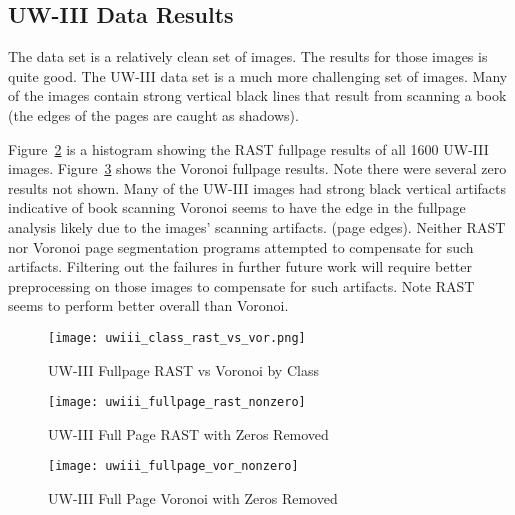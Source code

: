 \documentclass[conference]{IEEEtran}
\begin{document}
\subsection{UW-III Data Results}

The \cite{IEEEhowto:Winder} data set is a relatively clean set of images. The results for
those images is quite good. The UW-III data set is a much more challenging set
of images. Many of the images contain strong vertical black lines that result
from scanning a book (the edges of the pages are caught as shadows). 

Figure~\ref{fig:uwiii-fullpage-rast-nonzero} is a histogram showing the RAST fullpage results of
all 1600 UW-III images.  Figure~\ref{fig:uwiii-fullpage-vor-nonzero} shows the Voronoi
fullpage results. Note there were several zero results not shown. Many of the
UW-III images had strong black vertical artifacts indicative of book scanning
Voronoi seems to have the edge in the fullpage analysis likely due to the
images' scanning artifacts.  (page edges). Neither RAST nor Voronoi page
segmentation programs attempted to compensate for such artifacts. Filtering out
the failures in further future work will require better preprocessing on those
images to compensate for such artifacts. Note RAST seems to perform better
overall than Voronoi.

\begin{figure}[uwiii-class-rast-vs-vor]
\texttt{[image: uwiii\_class\_rast\_vs\_vor.png]}
\caption{UW-III Fullpage RAST vs Voronoi by Class}
\label{fig:uwiii-class-rast-vs-vor}
\end{figure}




\begin{figure}[uwiii-fullpage-rast-nonzero]
\texttt{[image: uwiii\_fullpage\_rast\_nonzero]}
\caption{UW-III Full Page RAST with Zeros Removed}
\label{fig:uwiii-fullpage-rast-nonzero}
\end{figure}
%
\begin{figure}[uwiii-fullpage-vor-nonzero]
\texttt{[image: uwiii\_fullpage\_vor\_nonzero]}
\caption{UW-III Full Page Voronoi with Zeros Removed}
\label{fig:uwiii-fullpage-vor-nonzero}
\end{figure}
\end{document}
